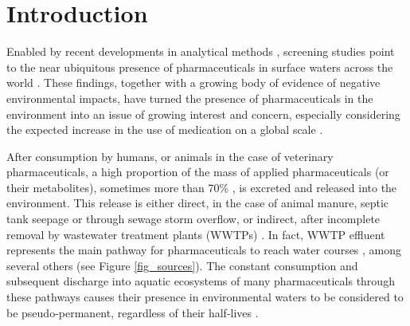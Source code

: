 \documentclass{article}
\begin{document}
\clearpage
\tableofcontents



\clearpage
{}
\section{Introduction}
Enabled by recent developments in analytical methods \citep{Knoll2020TrendsSamples}, screening studies point to the near ubiquitous presence of pharmaceuticals in surface waters across the world \citep{Bai2018OccurrenceWatersheds,Hughes2013GlobalSystems,Kolpin2002PharmaceuticalsReconnaissance}. These findings, together with a growing body of evidence of negative environmental impacts, have turned the presence of pharmaceuticals in the environment into an issue of growing interest and concern, especially considering the expected increase in the use of medication on a global scale \citep{Hughes2013GlobalSystems,UNEP2017PharmaceuticalsIssue}. 

After consumption by humans, or animals in the case of veterinary pharmaceuticals, a high proportion of the mass of applied pharmaceuticals (or their metabolites), sometimes more than 70\% \citep{Pal2010ImpactsEffects}, is excreted and released into the environment. This release is either direct, in the case of animal manure, septic tank seepage or through sewage storm overflow, or indirect, after incomplete removal by wastewater treatment plants (WWTPs) \citep{Yao2018OccurrenceStudy}. In fact, WWTP effluent represents the main pathway for pharmaceuticals to reach water courses \citep{Daughton2001PharmaceuticalsOverview}, among several others (see Figure \ref{fig_sources}). The constant consumption and subsequent discharge into aquatic ecosystems of many pharmaceuticals through these pathways causes their presence in environmental waters to be considered to be pseudo-permanent, regardless of their half-lives \citep{Feng2018Metal-mediatedAssessment}.
\end{document}
